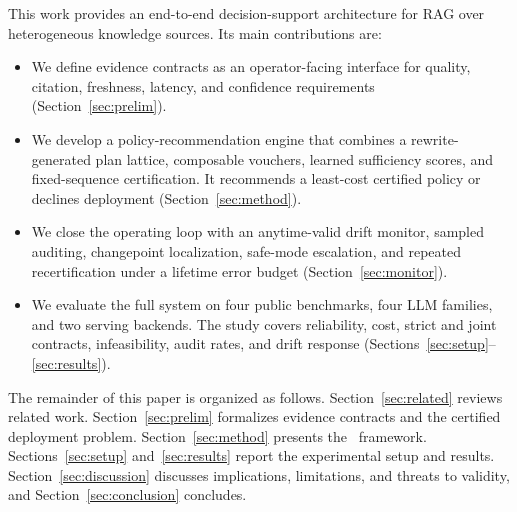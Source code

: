 This work provides an end-to-end decision-support architecture for RAG
over heterogeneous knowledge sources. Its main contributions are:
\begin{itemize}
\item We define evidence contracts as an operator-facing interface for
quality, citation, freshness, latency, and confidence requirements
(Section~\ref{sec:prelim}).
\item We develop a policy-recommendation engine that combines a
rewrite-generated plan lattice, composable vouchers, learned
sufficiency scores, and fixed-sequence certification. It recommends a
least-cost certified policy or declines deployment
(Section~\ref{sec:method}).
\item We close the operating loop with an anytime-valid drift monitor,
sampled auditing, changepoint localization, safe-mode escalation, and
repeated recertification under a lifetime error budget
(Section~\ref{sec:monitor}).
\item We evaluate the full system on four public benchmarks, four LLM
families, and two serving backends. The study covers reliability,
cost, strict and joint contracts, infeasibility, audit rates, and
drift response (Sections~\ref{sec:setup}--\ref{sec:results}).
\end{itemize}

The remainder of this paper is organized as follows.
Section~\ref{sec:related} reviews related work.
Section~\ref{sec:prelim} formalizes evidence contracts and the
certified deployment problem. Section~\ref{sec:method} presents the
\system\ framework. Sections~\ref{sec:setup} and~\ref{sec:results}
report the experimental setup and results. Section~\ref{sec:discussion}
discusses implications, limitations, and threats to validity, and
Section~\ref{sec:conclusion} concludes.
